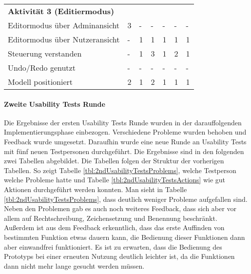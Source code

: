 \begin{table}[H]
\begin{tabular}{l||llllll}
        \textbf{Aktivität 3 (Editiermodus)} &           &           &           &           &           &           \\
        Editormodus über Adminansicht       &         3 &         - &         - &         - &         - &         - \\
        Editormodus über Nutzeransicht      &         - &         1 &         1 &         1 &         1 &         1 \\
        Steuerung verstanden                &         - &         1 &         3 &         1 &         2 &         1 \\
        Undo/Redo genutzt                   &         - &         - &         - &         - &         - &         - \\
        Modell positioniert                 &         2 &         1 &         2 &         1 &         1 &         1 \\
    \end{tabular}
\end{table}


\paragraph{Zweite Usability Tests Runde}

Die Ergebnisse der ersten Usability Tests Runde wurden in der darauffolgenden Implementierungsphase einbezogen. Verschiedene Probleme wurden behoben und Feedback wurde umgesetzt. Daraufhin wurde eine neue Runde an Usability Tests mit fünf neuen Testpersonen durchgeführt. Die Ergebnisse sind in den folgenden zwei Tabellen abgebildet. Die Tabellen folgen der Struktur der vorherigen Tabellen. So zeigt Tabelle \ref{tbl:2ndUsabilityTestsProblems}, welche Testperson welche Probleme hatte und Tabelle \ref{tbl:2ndUsabilityTestsActions} wie gut Aktionen durchgeführt werden konnten. Man sieht in Tabelle \ref{tbl:2ndUsabilityTestsProblems}, dass deutlich weniger Probleme aufgefallen sind. Neben den Problemen gab es auch noch weiteres Feedback, dass sich aber vor allem auf Rechtschreibung, Zeichensetzung und Benennung beschränkt. Außerdem ist aus dem Feedback erkenntlich, dass das erste Auffinden von bestimmten Funktion etwas dauern kann, die Bedienung dieser Funktionen dann aber einwandfrei funktioniert. Es ist zu erwarten, dass die Bedienung des Prototyps bei einer erneuten Nutzung deutlich leichter ist, da die Funktionen dann nicht mehr lange gesucht werden müssen.

